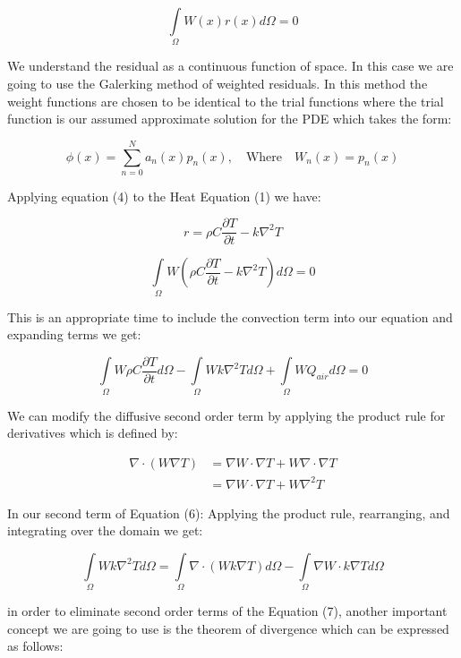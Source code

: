 \documentclass[12pt]{article}
\begin{document}
	\begin{equation}
		\int\limits_{\Omega} W(x) r(x) d\Omega = 0
	\end{equation}
	
	We understand the residual as a continuous function of space.  In this case we are going to use the Galerking method of weighted residuals. In this method the weight functions are chosen to be identical to the trial functions where the trial function is our assumed approximate solution for the PDE which takes the form:	

	\begin{equation}
		\phi(x) = \sum_{n=0}^N a_n(x)p_n(x), \quad \text{Where}  \quad W_n(x)=p_n(x)
	\end{equation}		
	
	Applying equation (4) to the Heat Equation (1) we have:

$$
r={\rho C \frac{\partial T}{\partial t} - k \nabla^2 T}
$$

	$$\int\limits_{\Omega} W ({\rho C \frac{\partial T}{\partial t} - k \nabla^2 T}) d\Omega = 0$$
	
	This is an appropriate time to include the convection term into our equation and expanding terms we get:
	
	\begin{equation}
		\int\limits_{\Omega} W \rho C \frac{\partial T}{\partial t} d\Omega - \int\limits_{\Omega} W k \nabla^2 T d\Omega + \int\limits_{\Omega} W Q_{air} d\Omega = 0
	\end{equation}

	We can modify the diffusive second order term by applying the product rule for derivatives which is defined by:
	
\begin{align*}
\nabla\cdot(W\nabla T) &= \nabla W \cdot\nabla T+W \nabla \cdot\nabla T \\
&=\nabla W \cdot\nabla T+W \nabla^2 T
\end{align*}

In our second term of Equation (6): Applying the product rule, rearranging, and integrating over the domain we get:
		
	\begin{equation}
	\int\limits_{\Omega} W k \nabla^2 T d\Omega = \int\limits_{\Omega} \nabla \cdot ({Wk\nabla T}) d\Omega - \int\limits_{\Omega} \nabla W \cdot k \nabla T d\Omega
	\end{equation}

	in order to eliminate second order terms of the Equation (7), another important concept we are going to use is the theorem of divergence which can be expressed as follows:
	
\end{document}
